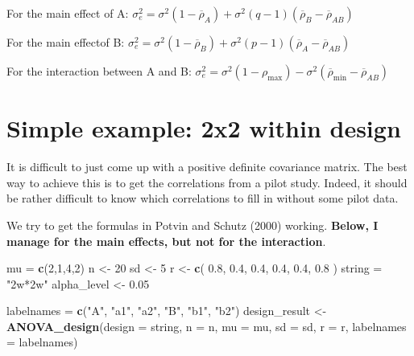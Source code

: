 \documentclass[]{book}
\newenvironment{Shaded}{\begin{snugshade}}{\end{snugshade}}
\newcommand{\DataTypeTok}[1]{\textcolor[rgb]{0.13,0.29,0.53}{#1}}
\newcommand{\DecValTok}[1]{\textcolor[rgb]{0.00,0.00,0.81}{#1}}
\newcommand{\FloatTok}[1]{\textcolor[rgb]{0.00,0.00,0.81}{#1}}
\newcommand{\KeywordTok}[1]{\textcolor[rgb]{0.13,0.29,0.53}{\textbf{#1}}}
\newcommand{\NormalTok}[1]{#1}
\newcommand{\StringTok}[1]{\textcolor[rgb]{0.31,0.60,0.02}{#1}}
\begin{document}
For the main effect of A:
\(\sigma _ { e } ^ { 2 } = \sigma ^ { 2 } ( 1 - \overline { \rho } _ { A } ) + \sigma ^ { 2 } ( q - 1 ) ( \overline { \rho } _ { B } - \overline { \rho } _ { AB } )\)

For the main effectof B:
\(\sigma _ { e } ^ { 2 } = \sigma ^ { 2 } ( 1 - \overline { \rho } _ { B } ) + \sigma ^ { 2 } ( p - 1 ) ( \overline { \rho } _ { A } - \overline { \rho } _ { A B } )\)

For the interaction between A and B:
\(\sigma _ { e } ^ { 2 } = \sigma ^ { 2 } ( 1 - \rho _ { \max } ) - \sigma ^ { 2 } ( \overline { \rho } _ { \min } - \overline { \rho } _ { AB } )\)

\hypertarget{simple-example-2x2-within-design}{%
\chapter{Simple example: 2x2 within design}\label{simple-example-2x2-within-design}}

It is difficult to just come up with a positive definite covariance matrix. The best way to achieve this is to get the correlations from a pilot study. Indeed, it should be rather difficult to know which correlations to fill in without some pilot data.

We try to get the formulas in Potvin and Schutz (2000) working. \textbf{Below, I manage for the main effects, but not for the interaction}.

\begin{Shaded}
\begin{Highlighting}[]
\NormalTok{mu =}\StringTok{ }\KeywordTok{c}\NormalTok{(}\DecValTok{2}\NormalTok{,}\DecValTok{1}\NormalTok{,}\DecValTok{4}\NormalTok{,}\DecValTok{2}\NormalTok{) }
\NormalTok{n <-}\StringTok{ }\DecValTok{20}
\NormalTok{sd <-}\StringTok{ }\DecValTok{5}
\NormalTok{r <-}\StringTok{ }\KeywordTok{c}\NormalTok{(}
  \FloatTok{0.8}\NormalTok{, }\FloatTok{0.4}\NormalTok{, }\FloatTok{0.4}\NormalTok{,}
       \FloatTok{0.4}\NormalTok{, }\FloatTok{0.4}\NormalTok{,}
            \FloatTok{0.8}
\NormalTok{  )}
\NormalTok{string =}\StringTok{ "2w*2w"}
\NormalTok{alpha_level <-}\StringTok{ }\FloatTok{0.05}

\NormalTok{labelnames =}\StringTok{ }\KeywordTok{c}\NormalTok{(}\StringTok{"A"}\NormalTok{, }\StringTok{"a1"}\NormalTok{, }\StringTok{"a2"}\NormalTok{, }\StringTok{"B"}\NormalTok{, }\StringTok{"b1"}\NormalTok{, }\StringTok{"b2"}\NormalTok{)}
\NormalTok{design_result <-}\StringTok{ }\KeywordTok{ANOVA_design}\NormalTok{(}\DataTypeTok{design =}\NormalTok{ string,}
                              \DataTypeTok{n =}\NormalTok{ n, }
                              \DataTypeTok{mu =}\NormalTok{ mu, }
                              \DataTypeTok{sd =}\NormalTok{ sd, }
                              \DataTypeTok{r =}\NormalTok{ r, }
                              \DataTypeTok{labelnames =}\NormalTok{ labelnames)}
\end{Highlighting}
\end{Shaded}
\end{document}
